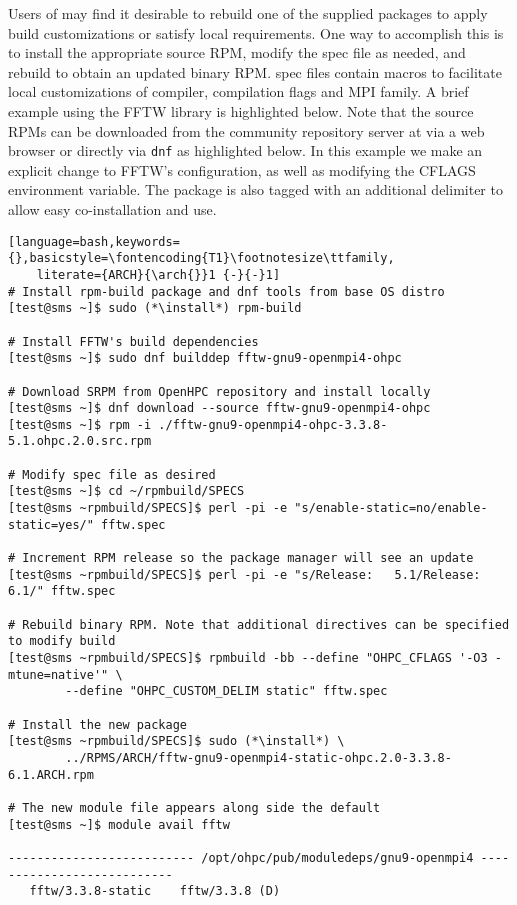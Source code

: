 Users of \OHPC{} may find it desirable to rebuild one of the supplied packages
to apply build customizations or satisfy local requirements. One way to
accomplish this is to install the appropriate source RPM, modify the spec file
as needed, and rebuild to obtain an updated binary RPM. \OHPC{} spec files
contain macros to facilitate local customizations of compiler, compilation
flags and MPI family. A brief example using
the FFTW library is highlighted below.  Note that the source RPMs can be downloaded from the
community repository server at \href{http://repos.openhpc.community}
{\color{blue}{http://repos.openhpc.community}} via a web browser or directly
via \texttt{dnf} as highlighted below. In this example we make an explicit
change to FFTW's configuration, as well as modifying the CFLAGS environment
variable. The package is also tagged with an additional delimiter to allow easy
co-installation and use. 

\begin{lstlisting}[language=bash,keywords={},basicstyle=\fontencoding{T1}\footnotesize\ttfamily,
    literate={ARCH}{\arch{}}1 {-}{-}1]
# Install rpm-build package and dnf tools from base OS distro
[test@sms ~]$ sudo (*\install*) rpm-build

# Install FFTW's build dependencies
[test@sms ~]$ sudo dnf builddep fftw-gnu9-openmpi4-ohpc

# Download SRPM from OpenHPC repository and install locally
[test@sms ~]$ dnf download --source fftw-gnu9-openmpi4-ohpc
[test@sms ~]$ rpm -i ./fftw-gnu9-openmpi4-ohpc-3.3.8-5.1.ohpc.2.0.src.rpm

# Modify spec file as desired
[test@sms ~]$ cd ~/rpmbuild/SPECS
[test@sms ~rpmbuild/SPECS]$ perl -pi -e "s/enable-static=no/enable-static=yes/" fftw.spec

# Increment RPM release so the package manager will see an update
[test@sms ~rpmbuild/SPECS]$ perl -pi -e "s/Release:   5.1/Release:   6.1/" fftw.spec

# Rebuild binary RPM. Note that additional directives can be specified to modify build
[test@sms ~rpmbuild/SPECS]$ rpmbuild -bb --define "OHPC_CFLAGS '-O3 -mtune=native'" \
        --define "OHPC_CUSTOM_DELIM static" fftw.spec

# Install the new package
[test@sms ~rpmbuild/SPECS]$ sudo (*\install*) \
        ../RPMS/ARCH/fftw-gnu9-openmpi4-static-ohpc.2.0-3.3.8-6.1.ARCH.rpm

# The new module file appears along side the default
[test@sms ~]$ module avail fftw

-------------------------- /opt/ohpc/pub/moduledeps/gnu9-openmpi4 ---------------------------
   fftw/3.3.8-static    fftw/3.3.8 (D)
\end{lstlisting}

